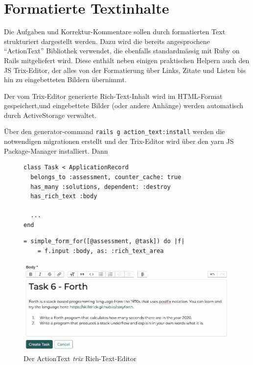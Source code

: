 \section{Formatierte Textinhalte}

Die Aufgaben und Korrektur-Kommentare sollen durch formatierten Text strukturiert dargestellt werden.
Dazu wird die bereits angesprochene \enquote{ActionText} Bibliothek verwendet, die ebenfalls standardmässig mit Ruby on Rails mitgeliefert wird.
Diese enthält neben einigen praktischen Helpern auch den JS Trix-Editor, der alles von der Formatierung über Links, Zitate und Listen bis hin zu eingebetteten Bildern übernimmt. 

Der vom Trix-Editor generierte Rich-Text-Inhalt wird im HTML-Format gespeichert,und eingebettete Bilder (oder andere Anhänge) werden automatisch durch ActiveStorage verwaltet.

Über den generator-command \texttt{rails g action_text:install} werden die notwendigen migrationen erstellt und
der Trix-Editor wird über den yarn JS Package-Manager installiert. Dann 

\begin{figure}[H]
\begin{codebox}
\begin{verbatim}
class Task < ApplicationRecord
  belongs_to :assessment, counter_cache: true
  has_many :solutions, dependent: :destroy
  has_rich_text :body
  
  ...
end
\end{verbatim}
\end{codebox}
\end{figure}

\begin{figure}[H]
\begin{codebox}
\begin{verbatim}
= simple_form_for([@assessment, @task]) do |f|
    = f.input :body, as: :rich_text_area
\end{verbatim}
\end{codebox}
\end{figure}

\begin{figure}[H]
  \centering
  \includegraphics[width=14cm]{images/trix.png}
  \caption{Der ActionText \emph{trix} Rich-Text-Editor}
\end{figure}
